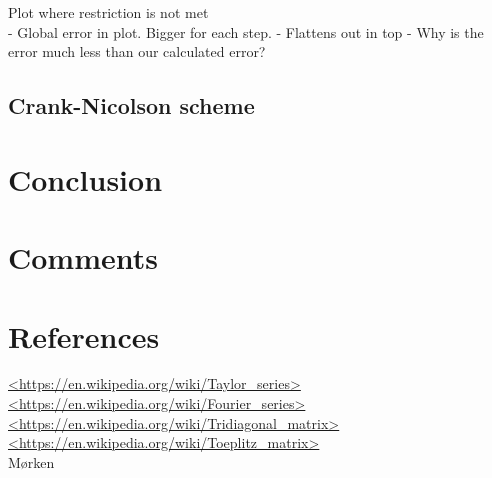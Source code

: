 \documentclass[12pt]{article}
\begin{document}
\begin{flushleft}
Plot where restriction is not met\\
- Global error in plot. Bigger for each step.
- Flattens out in top
- Why is the error much less than our calculated error?

\subsection{Crank-Nicolson scheme}

\section{Conclusion}

\section{Comments}

\section{References}
\url{<https://en.wikipedia.org/wiki/Taylor_series>}\\
\url{<https://en.wikipedia.org/wiki/Fourier_series>}\\
\url{<https://en.wikipedia.org/wiki/Tridiagonal_matrix>}\\
\url{<https://en.wikipedia.org/wiki/Toeplitz_matrix>}\\
Mørken

\end{flushleft}
\end{document}
